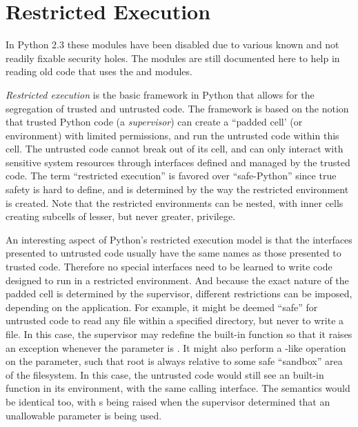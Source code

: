 \chapter{Restricted Execution \label{restricted}}

\begin{notice}[warning]
   In Python 2.3 these modules have been disabled due to various known
   and not readily fixable security holes.  The modules are still
   documented here to help in reading old code that uses the
    and  modules.
\end{notice}

\emph{Restricted execution} is the basic framework in Python that allows
for the segregation of trusted and untrusted code.  The framework is based on the
notion that trusted Python code (a \emph{supervisor}) can create a
``padded cell' (or environment) with limited permissions, and run the
untrusted code within this cell.  The untrusted code cannot break out
of its cell, and can only interact with sensitive system resources
through interfaces defined and managed by the trusted code.  The term
``restricted execution'' is favored over ``safe-Python''
since true safety is hard to define, and is determined by the way the
restricted environment is created.  Note that the restricted
environments can be nested, with inner cells creating subcells of
lesser, but never greater, privilege.

An interesting aspect of Python's restricted execution model is that
the interfaces presented to untrusted code usually have the same names
as those presented to trusted code.  Therefore no special interfaces
need to be learned to write code designed to run in a restricted
environment.  And because the exact nature of the padded cell is
determined by the supervisor, different restrictions can be imposed,
depending on the application.  For example, it might be deemed
``safe'' for untrusted code to read any file within a specified
directory, but never to write a file.  In this case, the supervisor
may redefine the built-in  function so that it raises
an exception whenever the  parameter is .  It
might also perform a -like operation on the
 parameter, such that root is always relative to some
safe ``sandbox'' area of the filesystem.  In this case, the untrusted
code would still see an built-in  function in its
environment, with the same calling interface.  The semantics would be
identical too, with s being raised when the
supervisor determined that an unallowable parameter is being used.

